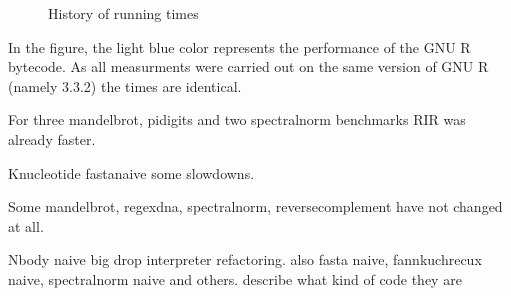 \begin{figure}[htbp]
  \caption{\label{fig:history}History of running times}
  \centering
\end{figure}

In the figure, the light blue color represents the performance of the GNU R bytecode. As all measurments were carried out on the same version of GNU R (namely 3.3.2) the times are identical.

For three mandelbrot, pidigits and two spectralnorm benchmarks RIR was already faster.

Knucleotide fastanaive some slowdowns.

Some mandelbrot, regexdna, spectralnorm, reversecomplement have not changed at all.

Nbody naive  big drop interpreter refactoring. also fasta naive, fannkuchrecux naive, spectralnorm naive and others. describe what kind of code they are

\begin{figure}[htbp]
  \caption{\label{fig:}\todo}
  \centering
\end{figure}

